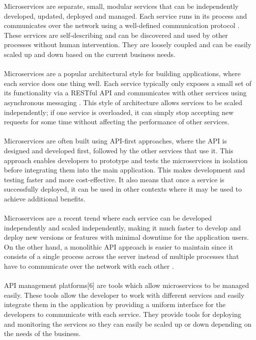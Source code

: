 \documentclass[BIF,Master,nenglish]{twbook}
\begin{document}
\noindent
Microservices are separate, small, modular services that can be independently developed, updated, deployed and managed. Each service runs in its process and communicates over the network using a well-defined communication protocol \cite{fow2014}. These services are self-describing and can be discovered and used by other processes without human intervention. They are loosely coupled and can be easily scaled up and down based on the current business needs.
\\
\\
Microservices are a popular architectural style for building applications, where each service does one thing well. Each service typically only exposes a small set of its functionality via a RESTful API and communicates with other services using asynchronous messaging \cite{gooMes}. This style of architecture allows services to be scaled independently; if one service is overloaded, it can simply stop accepting new requests for some time without affecting the performance of other services.
\\
\\
Microservices are often built using API-first approaches, where the API is designed and developed first, followed by the other services that use it. This approach enables developers to prototype and tests the microservices in isolation before integrating them into the main application. This makes development and testing faster and more cost-effective. It also means that once a service is successfully deployed, it can be used in other contexts where it may be used to achieve additional benefits.
\\
\\
Microservices are a recent trend where each service can be developed independently and scaled independently, making it much faster to develop and deploy new versions or features with minimal downtime for the application users. On the other hand, a monolithic API approach is easier to maintain since it consists of a single process across the server instead of multiple processes that have to communicate over the network with each other \cite{pat2021}.
\\
\\
API management platforms[6] are tools which allow microservices to be managed easily. These tools allow the developer to work with different services and easily integrate them in the application by providing a uniform interface for the developers to communicate with each service. They provide tools for deploying and monitoring the services so they can easily be scaled up or down depending on the needs of the business.
\end{document}
